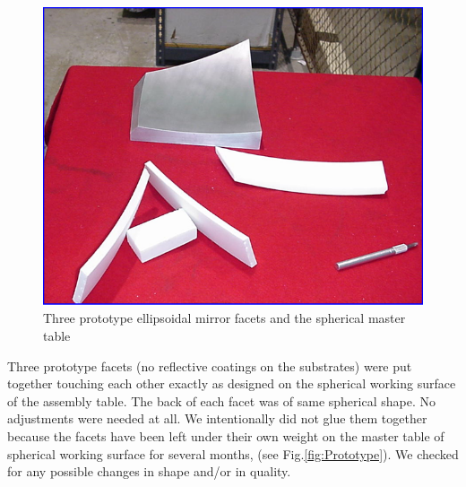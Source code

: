 \begin{figure}[h]
    \centering
    \includegraphics[width=1.0\linewidth]{images/Proto_4parts.png}
    \caption{Three prototype ellipsoidal mirror facets and the spherical master table}
    \label{fig:Proto_4parts}
\end{figure}

Three prototype facets (no reflective coatings on the substrates) were put together touching each other exactly as designed on the spherical working surface of the assembly table. The back of each facet was of same spherical shape. No adjustments were needed at all. We intentionally did not glue them together because the facets have been left under their own weight on the master table of spherical working surface for several months, (see Fig.\ref{fig:Prototype}). We checked for any possible changes in shape and/or in quality.

